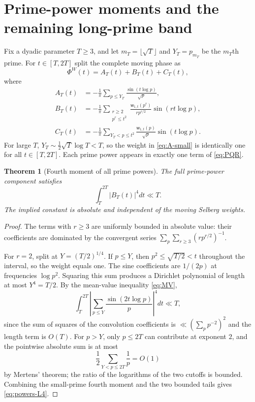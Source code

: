 \documentclass[11pt,leqno]{amsart}
\numberwithin{equation}{section}
\newtheorem{theorem}{Theorem}[section]
\theoremstyle{definition}
\theoremstyle{remark}
\newcommand{\1}{\mathbf 1}
\newcommand{\wt}{\mathsf w}
\newcommand{\floor}[1]{\lfloor #1\rfloor}
\begin{document}
\section{Prime-power moments and the remaining long-prime band}\label{sec:powers}
Fix a dyadic parameter $T\ge3$, and let $m_T=\floor{\sqrt T}$ and $Y_T=p_{m_T}$ be the $m_T$th prime. For $t\in[T,2T]$ split the complete moving phase as
\begin{equation}\label{eq:PQR}
 \Phi^W(t)=A_T(t)+B_T(t)+C_T(t),
\end{equation}
where
\begin{align}
 A_T(t)&=-\frac1\pi\sum_{p\le Y_T}\frac{\sin(t\log p)}{\sqrt p},\label{eq:A-small}\\
 B_T(t)&=-\frac1\pi\sum_{\substack{r\ge2\\p^r\le t^2}}
 \frac{\wt_{1,t}(p^r)}{r p^{r/2}}\sin(rt\log p),\label{eq:B-powers}\\
 C_T(t)&=-\frac1\pi\sum_{Y_T<p\le t^2}\frac{\wt_{1,t}(p)}{\sqrt p}\sin(t\log p).\label{eq:C-large}
\end{align}
For large $T$, $Y_T\sim\frac12\sqrt T\log T<T$, so the weight in \eqref{eq:A-small} is identically one for all $t\in[T,2T]$. Each prime power appears in exactly one term of \eqref{eq:PQR}.
\begin{theorem}[Fourth moment of all prime powers]\label{thm:prime-powers}
The full prime-power component satisfies
\begin{equation}\label{eq:powers-L4}
 \boxed{\int_T^{2T}|B_T(t)|^4dt\ll T.}
\end{equation}
The implied constant is absolute and independent of the moving Selberg weights.
\end{theorem}
\begin{proof}
The terms with $r\ge3$ are uniformly bounded in absolute value: their coefficients are dominated by the convergent series $\sum_p\sum_{r\ge3}(r p^{r/2})^{-1}$.\par
For $r=2$, split at $Y=(T/2)^{1/4}$. If $p\le Y$, then $p^2\le\sqrt{T/2}<t$ throughout the interval, so the weight equals one. The sine coefficients are $1/(2p)$ at frequencies $\log p^2$. Squaring this sum produces a Dirichlet polynomial of length at most $Y^4=T/2$. By the mean-value inequality \eqref{eq:MV},
\[
 \int_T^{2T}\left|\sum_{p\le Y}\frac{\sin(2t\log p)}p\right|^4dt\ll T,
\]
since the sum of squares of the convolution coefficients is $\ll(\sum_pp^{-2})^2$ and the length term is $O(T)$. For $p>Y$, only $p\le2T$ can contribute at exponent $2$, and the pointwise absolute sum is at most
\[
 \frac12\sum_{Y<p\le2T}\frac1p=O(1)
\]
by Mertens' theorem; the ratio of the logarithms of the two cutoffs is bounded. Combining the small-prime fourth moment and the two bounded tails gives \eqref{eq:powers-L4}.
\end{proof}
\end{document}
